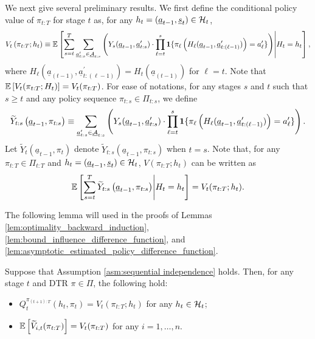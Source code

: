 We next give several preliminary results. We first define the conditional policy value of $\pi_{t:T}$ for stage $t$ as, for any $h_{t} = (\underline{a}_{t-1},\underline{s}_{t}) \in \mathcal{H}_{t}$,
\begin{align*}
    V_{t}\left(\pi_{t:T};h_{t}\right) \equiv \mathbb{E}\left[\sum_{s=t}^{T}\sum_{\underline{a}_{t:s}^{\prime} \in \underline{\mathcal{A}}_{t:s}}\left( Y_{s}(\underline{a}_{t-1},\underline{a}_{t:s}^{\prime})\cdot \prod_{\ell=t}^{s}\mathbf{1}\{\pi_{\ell}\left(H_{\ell}(\underline{a}_{t-1},\underline{a}_{t:(\ell-1)}^{\prime})\right)=a_{\ell}^{\prime}\}\right)\middle| H_{t}=h_{t}\right],
\end{align*}
where $H_{\ell}(\underline{a}_{(t-1)},\underline{a}_{t:(\ell-1)}^{\prime})=H_{t}(\underline{a}_{(t-1)})$ for $\ell=t$.
Note that $\mathbb{E}\left[V_t(\pi_{t:T};H_{t})\right] = V_{t}(\pi_{t:T})$. For ease of notations, for any stages $s$ and $t$ such that $s \geq t$ and any policy sequence $\pi_{t:s}\in \Pi_{t:s}$, we define
\begin{align*}
    \widetilde{Y}_{t:s}\left(\underline{a}_{t-1},\pi_{t:s}\right) \equiv \sum_{\underline{a}_{t:s}^{\prime} \in \underline{\mathcal{A}}_{t:s}}\left( Y_{s}(\underline{a}_{t-1},\underline{a}_{t:s}^{\prime})\cdot \prod_{\ell=t}^{s}\mathbf{1}\{\pi_{\ell}\left(H_{\ell}(\underline{a}_{t-1},\underline{a}_{t:(\ell-1)}^{\prime})\right)=a_{\ell}^{\prime}\}\right).
\end{align*}
Let $\widetilde{Y}_{t}\left(\underline{a}_{t-1},\pi_{t}\right)$ denote $\widetilde{Y}_{t:s}\left(\underline{a}_{t-1},\pi_{t:s}\right)$ when $t=s$. Note that, for any $\pi_{t:T} \in \Pi_{t:T}$ and $h_{t} = (\underline{a}_{t-1},\underline{s}_{t}) \in \mathcal{H}_{t}$, $V(\pi_{t:T};h_{t})$ can be written as  $$\mathbb{E}\left[\sum_{s=t}^{T}\widetilde{Y}_{t:s}\left(\underline{a}_{t-1},\pi_{t:s}\right) \middle| H_{t}=h_{t}\right] = V_{t}(\pi_{t:T};h_{t}).$$

The following lemma will used in the proofs of Lemmas \ref{lem:optimality_backward_induction}, \ref{lem:bound_influence_difference_function}, and \ref{lem:asymptotic_estimated_policy_difference_function}.

\medskip{}

\begin{lemma}\label{lemma:identification}
Suppose that Assumption \ref{asm:sequential independence} holds. Then, for any stage $t$ and DTR $\pi \in \Pi$, the following hold:
\begin{itemize}
\item[(i)] $Q_{t}^{\pi_{(t+1):T}}(h_{t},\pi_{t}) = V_{t}(\pi_{t:T};h_{t})$ for any $h_{t} \in \mathcal{H}_{t}$;
    \item[(ii)] $\mathbb{E}\left[\widetilde{V}_{i,t}(\pi_{t:T})\right] = V_{t}(\pi_{t:T})$ for any $i=1,\ldots,n$. 
\end{itemize}
\end{lemma}
\medskip

